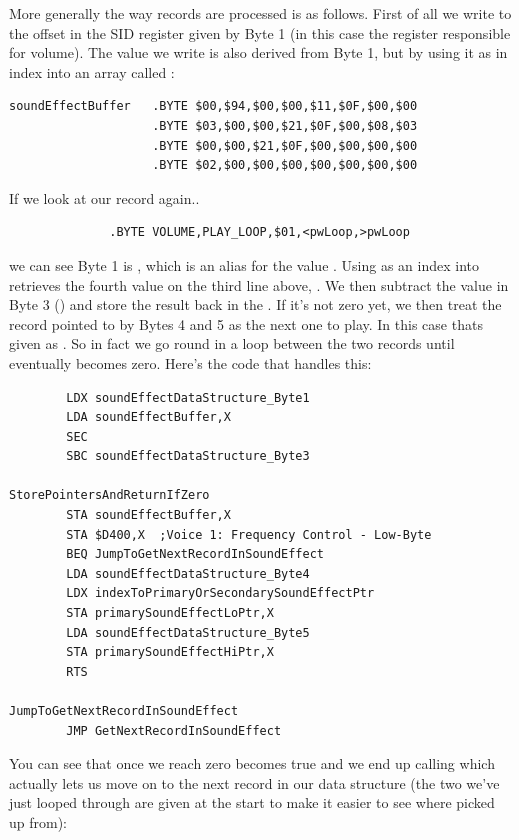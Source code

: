 More generally the way  records are processed is as follows. First of all we write to the offset in the SID register 
given by Byte 1 (in this case the register responsible for volume). The value we write is also derived from Byte 1, but by using it
as in index into an array called :

\begin{lstlisting}
soundEffectBuffer   .BYTE $00,$94,$00,$00,$11,$0F,$00,$00
                    .BYTE $03,$00,$00,$21,$0F,$00,$08,$03
                    .BYTE $00,$00,$21,$0F,$00,$00,$00,$00
                    .BYTE $02,$00,$00,$00,$00,$00,$00,$00
\end{lstlisting}


If we look at our record again..

\begin{lstlisting}
              .BYTE VOLUME,PLAY_LOOP,$01,<pwLoop,>pwLoop
\end{lstlisting}

we can see Byte 1 is , which is an alias for the value . Using  as an index into
 retrieves the fourth value on the third line above, . We then subtract the value
in Byte 3 () and store the result back in the . If it's not zero yet,
we then treat the record pointed to by Bytes 4 and 5 as the next one to play. In this case thats given as . So in
fact we go round in a loop between the two records until  eventually becomes zero. Here's the code that handles this:


\begin{lstlisting}
        LDX soundEffectDataStructure_Byte1
        LDA soundEffectBuffer,X
        SEC
        SBC soundEffectDataStructure_Byte3

StorePointersAndReturnIfZero
        STA soundEffectBuffer,X
        STA $D400,X  ;Voice 1: Frequency Control - Low-Byte
        BEQ JumpToGetNextRecordInSoundEffect
        LDA soundEffectDataStructure_Byte4
        LDX indexToPrimaryOrSecondarySoundEffectPtr
        STA primarySoundEffectLoPtr,X
        LDA soundEffectDataStructure_Byte5
        STA primarySoundEffectHiPtr,X
        RTS

JumpToGetNextRecordInSoundEffect   
        JMP GetNextRecordInSoundEffect
\end{lstlisting}

You can see that once we reach zero  becomes true and we end up calling 
 which actually lets us move on to the next record in our data structure (the two
we've just looped through are given at the start to make it easier to see where picked up from):

